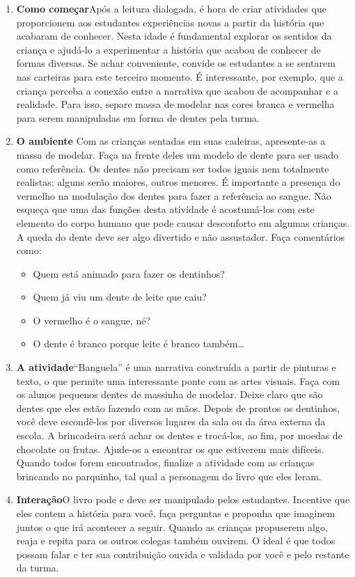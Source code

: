 \documentclass[11pt]{extarticle}
\begin{document}
\begin{enumerate}
\item \textbf{Como começar}\quad Após a leitura dialogada, é hora de criar 
atividades que proporcionem aos estudantes experiências novas a partir da história 
que acabaram de conhecer. Nesta idade é fundamental explorar os sentidos da criança e 
ajudá-lo a experimentar a história que acabou de conhecer de formas diversas. Se achar 
conveniente, convide os estudantes a se sentarem nas carteiras para este terceiro 
momento. É interessante, por exemplo, que a criança perceba a conexão 
entre a narrativa que acabou de acompanhar e a realidade. Para isso, separe 
massa de modelar nas cores branca e vermelha para serem manipuladas em forma de dentes
pela turma. 

\item \textbf{O ambiente}\quad 
Com as crianças sentadas em suas cadeiras, apresente-as a massa de modelar.
Faça na frente deles um modelo de dente para ser usado como referência. 
Os dentes não precisam ser todos iguais nem totalmente realistas: alguns
serão maiores, outros menores. É importante a presença do vermelho
na modulação dos dentes para fazer a referência ao sangue. 
Não esqueça que uma das funções desta atividade é acostumá-los 
com este elemento do corpo humano que pode causar desconforto 
em algumas crianças. A queda do dente deve ser algo divertido e não assustador. 
Faça comentários como:

\begin{itemize}
	\item Quem está animado para fazer os dentinhos?
	\item Quem já viu um dente de leite que caiu?
	\item O vermelho é o sangue, né?
	\item O dente é branco porque leite é branco também\dots{}
\end{itemize}


\item \textbf{A atividade}\quad “Banguela” é uma narrativa 
construída a partir de pinturas e texto, o que permite
uma interessante ponte com as artes visuais. 
Faça com os alunos pequenos dentes de massinha de modelar. 
Deixe claro que são dentes que eles estão fazendo com as mãos. 
Depois de prontos os dentinhos, você deve escondê-los por diversos lugares 
da sala ou da área externa da escola. A brincadeira será achar os dentes
e trocá-los, ao fim, por moedas de chocolate ou frutas.
Ajude-os a encontrar os que estiverem mais difíceis.
Quando todos forem encontrados, finalize a atividade com 
as crianças brincando no parquinho, tal qual a personagem
do livro que eles leram.

\item \textbf{Interação}\quad O livro pode e deve ser 
manipulado pelos estudantes. Incentive que eles contem a história para 
você, faça perguntas e proponha que imaginem juntos o que irá acontecer a seguir. 
Quando as crianças propuserem algo, reaja e repita para os outros colegas
também ouvirem. O ideal é que todos possam falar e ter sua contribuição
ouvida e validada por você e pelo restante da turma.
\end{enumerate}
\end{document}
